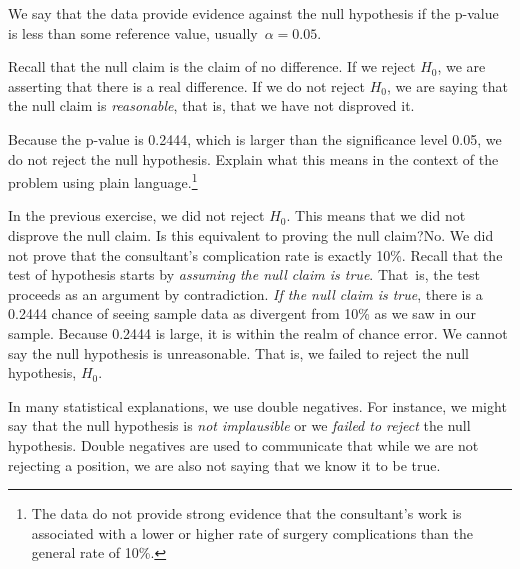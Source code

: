 \begin{termBox}{
We say that the data provide  evidence against the null hypothesis if the p-value is less than some reference value, usually~$\alpha=0.05$.}
\end{termBox}

Recall that the null claim is the claim of no difference.  If we reject $H_0$, we are asserting that there is a real difference.  If we do not reject $H_0$, we are saying that the null claim is \emph{reasonable}, that is, that we have not disproved it.  

\begin{exercise} \label{plainLanguageExplanationOfHTConclusionForLiverDonorSurgicalConsultant}
Because the p-value is 0.2444, which is larger than the significance level 0.05, we do not reject the null hypothesis. Explain what this means in the context of the problem using plain language.\footnote{The data do not provide strong evidence that the consultant's work is associated with a lower or higher rate of surgery complications than the general rate of 10\%.}
\end{exercise}

\begin{example}{In the previous exercise, we did not reject $H_0$.  This means that we did not disprove the null claim.  Is this equivalent to proving the null claim?}No. We did not prove that the consultant's complication rate is exactly 10\%.  Recall that the test of hypothesis starts by \emph{assuming the null claim is true}.  That~is, the test proceeds as an argument by contradiction.  \emph{If the null claim is true}, there is a 0.2444 chance of seeing sample data as divergent from 10\% as we saw in our sample.  Because 0.2444 is large, it is within the realm of chance error.  We cannot say the null hypothesis is unreasonable.  That is, we failed to reject the null hypothesis, $H_0$.\end{example}


\begin{tipBox}{
In many statistical explanations, we use double negatives. For instance, we might say that the null hypothesis is \emph{not implausible} or we \emph{failed to reject} the null hypothesis. Double negatives are used to communicate that while we are not rejecting a position, we are also not saying that we know it to be true.}
\end{tipBox}

